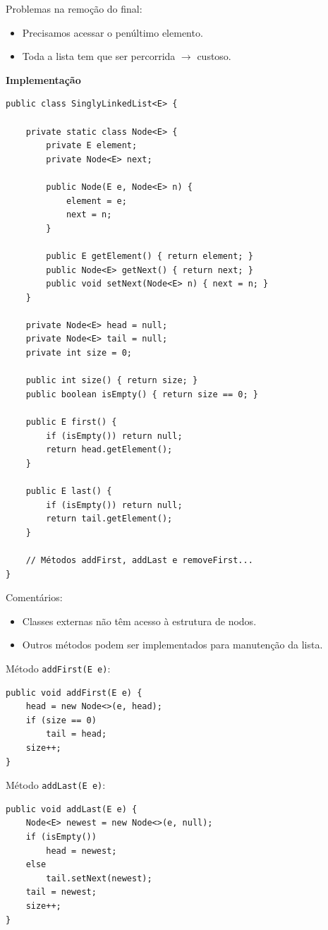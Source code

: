 {\color{redtext}
Problemas na remoção do final:
\begin{itemize}
	\item Precisamos acessar o penúltimo elemento.
	\item Toda a lista tem que ser percorrida $\to$ custoso.
\end{itemize}
}

\textbf{Implementação}

\medskip

\begin{verbatim}
public class SinglyLinkedList<E> {
	
	private static class Node<E> {
		private E element;
		private Node<E> next;
		
		public Node(E e, Node<E> n) {
			element = e;
			next = n;
		}
		
		public E getElement() { return element; }
		public Node<E> getNext() { return next; }
		public void setNext(Node<E> n) { next = n; }
	}
	
	private Node<E> head = null;
	private Node<E> tail = null;
	private int size = 0;
	
	public int size() { return size; }
	public boolean isEmpty() { return size == 0; }
	
	public E first() {
		if (isEmpty()) return null;
		return head.getElement();
	}
	
	public E last() {
		if (isEmpty()) return null;
		return tail.getElement();
	}
	
	// Métodos addFirst, addLast e removeFirst...
}
\end{verbatim}

\clearpage

{\color{redtext}
Comentários:
\begin{itemize}
	\item Classes externas não têm acesso à estrutura de nodos.
	\item Outros métodos podem ser implementados para manutenção da lista.
\end{itemize}
}

\bigskip

Método \texttt{addFirst(E e)}:
\begin{verbatim}
public void addFirst(E e) {
	head = new Node<>(e, head);
	if (size == 0)
		tail = head;
	size++;
}
\end{verbatim}

\medskip

Método \texttt{addLast(E e)}:
\begin{verbatim}
public void addLast(E e) {
	Node<E> newest = new Node<>(e, null);
	if (isEmpty())
		head = newest;
	else
		tail.setNext(newest);
	tail = newest;
	size++;
}
\end{verbatim}

